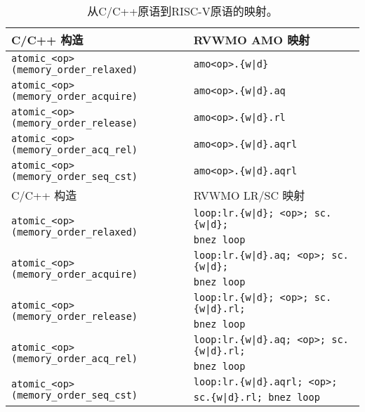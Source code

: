 \begin{table}[h!]
\begin{tabular}{|l|l|}
    \hline
    \hline
    C/C++ 构造                          & RVWMO AMO 映射        \\
    \hline
    \tt atomic\_<op>(memory\_order\_relaxed)  & \tt amo<op>.\{w|d\}      \\
    \hline
    \tt atomic\_<op>(memory\_order\_acquire)  & \tt amo<op>.\{w|d\}.aq   \\
    \hline
    \tt atomic\_<op>(memory\_order\_release)  & \tt amo<op>.\{w|d\}.rl   \\
    \hline
    \tt atomic\_<op>(memory\_order\_acq\_rel) & \tt amo<op>.\{w|d\}.aqrl \\
    \hline
    \tt atomic\_<op>(memory\_order\_seq\_cst) & \tt amo<op>.\{w|d\}.aqrl \\
    \hline
    \hline
    C/C++ 构造                           & RVWMO LR/SC 映射\\
    \hline
    \multirow{2}{*}{\tt atomic\_<op>(memory\_order\_relaxed)}
      & \tt loop:\@ lr.\{w|d\}; <op>; sc.\{w|d\}; \\
      & \tt bnez loop \\
    \hline
    \multirow{2}{*}{\tt atomic\_<op>(memory\_order\_acquire)}
      & \tt loop:\@ lr.\{w|d\}.aq; <op>; sc.\{w|d\}; \\
      & \tt bnez loop \\
    \hline
    \multirow{2}{*}{\tt atomic\_<op>(memory\_order\_release)}
      & \tt loop:\@ lr.\{w|d\}; <op>; sc.\{w|d\}.rl; \\
      & \tt bnez loop \\
    \hline
    \multirow{2}{*}{\tt atomic\_<op>(memory\_order\_acq\_rel)}
      & \tt loop:\@ lr.\{w|d\}.aq; <op>; sc.\{w|d\}.rl; \\
      & \tt bnez loop \\
    \hline
    \multirow{2}{*}{\tt atomic\_<op>(memory\_order\_seq\_cst)}
      & \tt loop:\@ lr.\{w|d\}.aqrl; <op>; \\
      & \tt sc.\{w|d\}.rl; bnez loop \\
    \hline
  \end{tabular}
  \caption{从C/C++原语到RISC-V原语的映射。
    }
  \label{tab:c11mappings}
\end{table}

